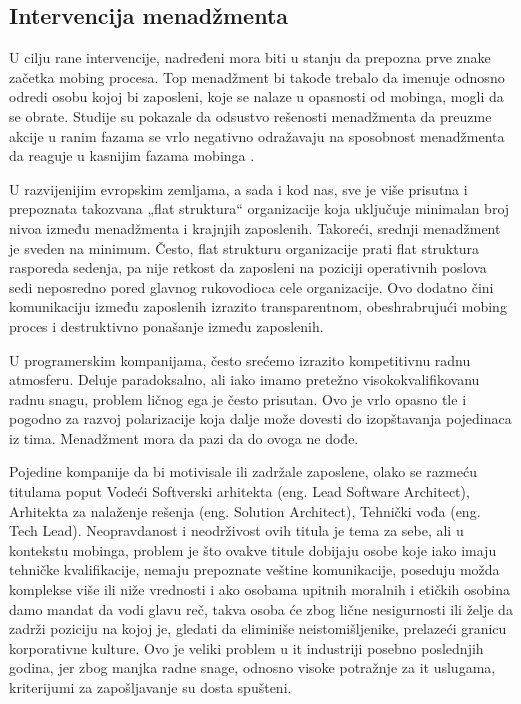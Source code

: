 \documentclass[a4paper]{article}
\newcommand{\quotes}[1]{„#1“}
\begin{document}
    \subsection{Intervencija menadžmenta}
    U cilju rane intervencije, nadređeni mora biti u stanju da prepozna prve znake začetka mobing procesa. Top menadžment bi takođe trebalo da imenuje odnosno odredi osobu kojoj bi zaposleni, koje se nalaze u opasnosti od mobinga, mogli da se obrate. Studije su pokazale da odsustvo rešenosti menadžmenta da preuzme akcije u ranim fazama se vrlo negativno odražavaju na sposobnost menadžmenta da reaguje u kasnijim fazama mobinga \cite{leymann1992}.
    
    U razvijenijim evropskim zemljama, a sada i kod nas, sve je više prisutna i prepoznata takozvana \quotes{flat struktura} organizacije koja uključuje minimalan broj nivoa između menadžmenta i krajnjih zaposlenih. Takoreći, srednji menadžment je sveden na minimum. Često, flat strukturu organizacije prati flat struktura rasporeda sedenja, pa nije retkost da zaposleni na poziciji operativnih poslova sedi neposredno pored glavnog rukovodioca cele organizacije. Ovo dodatno čini komunikaciju između zaposlenih izrazito transparentnom, obeshrabrujući mobing proces i destruktivno ponašanje između zaposlenih.
    
    U programerskim kompanijama, često srećemo izrazito kompetitivnu radnu atmosferu. Deluje paradoksalno, ali iako imamo pretežno visokokvalifikovanu radnu snagu, problem ličnog ega je često prisutan. Ovo je vrlo opasno tle i pogodno za razvoj polarizacije koja dalje može dovesti do izopštavanja pojedinaca iz tima. Menadžment mora da pazi da do ovoga ne dođe.
    
    Pojedine kompanije da bi motivisale ili zadržale zaposlene, olako se razmeću titulama poput Vodeći Softverski arhitekta (eng. Lead Software Architect), Arhitekta za nalaženje rešenja (eng. Solution Architect), Tehnički vođa (eng. Tech Lead). Neopravdanost i neodrživost ovih titula je tema za sebe, ali u kontekstu mobinga, problem je što ovakve titule dobijaju osobe koje iako imaju tehničke kvalifikacije, nemaju prepoznate veštine komunikacije, poseduju možda komplekse više ili niže vrednosti i ako osobama upitnih moralnih i etičkih osobina damo mandat da vodi glavu reč, takva osoba će zbog lične nesigurnosti ili želje da zadrži poziciju na kojoj je, gledati da eliminiše neistomišljenike, prelazeći granicu korporativne kulture. Ovo je veliki problem u \acrshort{it} industriji posebno poslednjih godina, jer zbog manjka radne snage, odnosno visoke potražnje za \acrshort{it} uslugama, kriterijumi za zapošljavanje su dosta spušteni.
    
\end{document}
